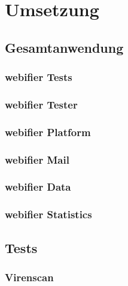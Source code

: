 \chapter{Umsetzung}

\section{Gesamtanwendung}


\subsection{webifier Tests}


\subsection{webifier Tester}


\subsection{webifier Platform}


\subsection{webifier Mail}


\subsection{webifier Data}


\subsection{webifier Statistics}


\section{Tests}

\subsection{Virenscan}

